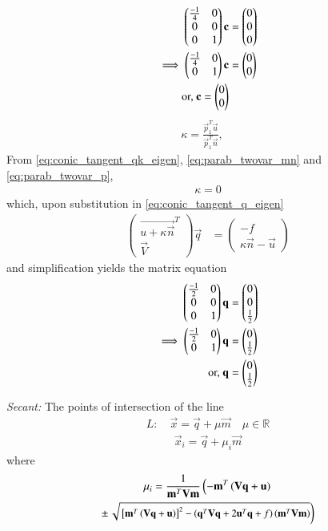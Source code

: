 \documentclass[journal,12pt,twocolumn]{IEEEtran}
\begin{document}
\begin{align}
\begin{pmatrix}\frac{-1}{4} & 0 \\ 0 & 0 \\ 0 & 1\end{pmatrix}\mathbf{c} &= \begin{pmatrix}0 \\ 0\\0\end{pmatrix} 
\\
\implies 
\begin{pmatrix}\frac{-1}{4} & 0 \\  0 & 1\end{pmatrix}\mathbf{c} &= \begin{pmatrix}0 \\ 0\end{pmatrix} 
\\
\text{or, } \mathbf{c} = \begin{pmatrix}0\\0\end{pmatrix}
\end{align}
\begin{align}
\label{eq:conic_tangent_qk_eigen} \kappa = \frac{\vec{p}_1^T\vec{u}}{\vec{p}_1^T\vec{n}}, \quad 
\end{align}
From \eqref{eq:conic_tangent_qk_eigen}, \eqref{eq:parab_twovar_mn} and \eqref{eq:parab_twovar_p},
\begin{align}
\kappa = 0
\end{align}
which, upon substitution in  \eqref{eq:conic_tangent_q_eigen}
\begin{align}
\label{eq:conic_tangent_q_eigen}
\begin{pmatrix}
\vec{u+\kappa \vec{n}}^T \\ \vec{V}
\end{pmatrix}
\vec{q} &= 
\begin{pmatrix}
-f
\\
\kappa\vec{n}-\vec{u}
\end{pmatrix}
\end{align}
and simplification yields the matrix equation
\begin{align}
\begin{pmatrix}\frac{-1}{2} & 0 \\0 & 0\\0&1\end{pmatrix}\mathbf{q} &= \begin{pmatrix}0\\0\\\frac{1}{2}\end{pmatrix}
\\
\implies \begin{pmatrix}\frac{-1}{2} & 0\\0&1\end{pmatrix}\mathbf{q} &= \begin{pmatrix}0\\\frac{1}{2}\end{pmatrix}
\\
\text{or, } \mathbf{q} &= \begin{pmatrix}0 \\\frac{1}{2}\end{pmatrix}
\end{align}
\item 
{\em Secant: }The points of intersection of the line 
\begin{align}
L: \quad \vec{x} = \vec{q} + \mu \vec{m} \quad \mu \in \mathbb{R}
\label{eq:conic_tangent}
\end{align}
\begin{align}\label{eq:parametricform}
\vec{x}_i = \vec{q} + \mu_i \vec{m}
\end{align}
%
where
\begin{multline}
\mu_i = \frac{1}
{
\mathbf{m}^T\mathbf{V}\mathbf{m}
}
\left(-\mathbf{m}^T\left(\mathbf{V}\mathbf{q}+\mathbf{u}\right)\right.
\\
\pm
{\small
\ensuremath{\left.\sqrt{
{}\left[
\mathbf{m}^T\left(\mathbf{V}\mathbf{q}+\mathbf{u}\right)
\right]^2
-
\left(
\mathbf{q}^T\mathbf{V}\mathbf{q} + 2\mathbf{u}^T\mathbf{q} +f
\right)
\left(\mathbf{m}^T\mathbf{V}\mathbf{m}\right)
}
\right)}
}
\label{eq:tangent_roots}
\end{multline}
                    
\end{document}
